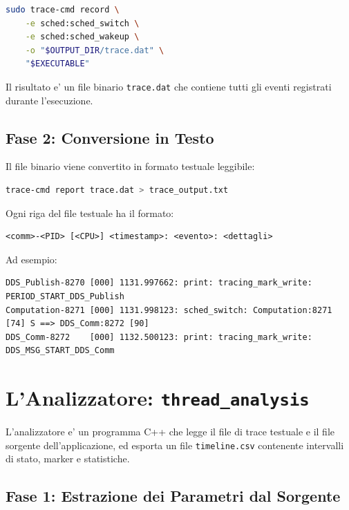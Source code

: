 \begin{lstlisting}[language=bash, caption={Comando di acquisizione.}, label={lst:tracecmd}]
sudo trace-cmd record \
    -e sched:sched_switch \
    -e sched:sched_wakeup \
    -o "$OUTPUT_DIR/trace.dat" \
    "$EXECUTABLE"
\end{lstlisting}

Il risultato e' un file binario \texttt{trace.dat} che contiene tutti
gli eventi registrati durante l'esecuzione.

\subsection{Fase 2: Conversione in Testo}
\label{subsec:report}

Il file binario viene convertito in formato testuale leggibile:

\begin{lstlisting}[language=bash]
trace-cmd report trace.dat > trace_output.txt
\end{lstlisting}

Ogni riga del file testuale ha il formato:
\begin{verbatim}
<comm>-<PID> [<CPU>] <timestamp>: <evento>: <dettagli>
\end{verbatim}

Ad esempio:
\begin{verbatim}
DDS_Publish-8270 [000] 1131.997662: print: tracing_mark_write: PERIOD_START_DDS_Publish
Computation-8271 [000] 1131.998123: sched_switch: Computation:8271 [74] S ==> DDS_Comm:8272 [90]
DDS_Comm-8272    [000] 1132.500123: print: tracing_mark_write: DDS_MSG_START_DDS_Comm
\end{verbatim}


\section{L'Analizzatore: \texttt{thread\_analysis}}
\label{sec:thread_analysis}

L'analizzatore e' un programma C++ che legge il file di trace testuale
e il file sorgente dell'applicazione, ed esporta un file
\texttt{timeline.csv} contenente intervalli di stato, marker e statistiche.

\subsection{Fase 1: Estrazione dei Parametri dal Sorgente}
\label{subsec:source_parsing}

